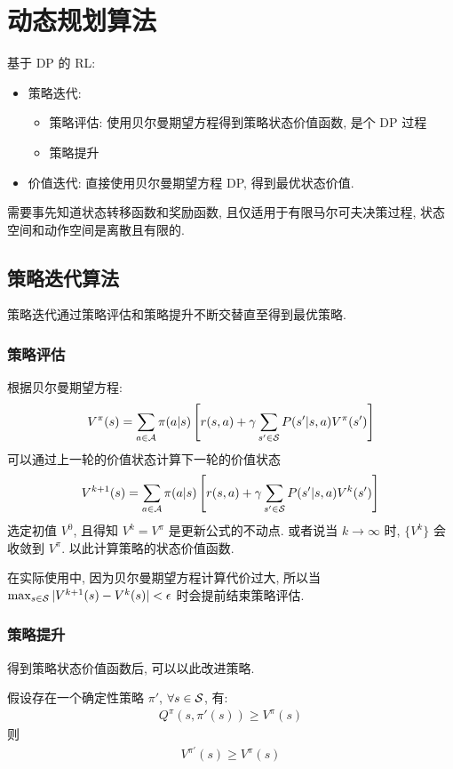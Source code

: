 \newpage
\section{动态规划算法}

基于 DP 的 RL:
\begin{itemize}
    \item 策略迭代:
    \begin{itemize}
        \item 策略评估: 使用贝尔曼期望方程得到策略状态价值函数, 是个 DP 过程
        \item 策略提升
    \end{itemize}
    \item 价值迭代: 直接使用贝尔曼期望方程 DP, 得到最优状态价值. 
\end{itemize}

需要事先知道状态转移函数和奖励函数, 且仅适用于有限马尔可夫决策过程, 状态空间和动作空间是离散且有限的. 


\subsection{策略迭代算法}
策略迭代通过策略评估和策略提升不断交替直至得到最优策略.


\subsubsection{策略评估}
根据贝尔曼期望方程:
\begin{align*}
    V^\pi(s)=\sum_{a\in\mathcal{A}}\pi(a|s) \left[ r(s,a) + \gamma \sum_{s'\in\mathcal{S}} P(s'|s, a)V^\pi(s') \right]
\end{align*}
可以通过上一轮的价值状态计算下一轮的价值状态
\begin{align*}
    V^{k+1}(s)=\sum_{a\in\mathcal{A}}\pi(a|s) \left[ r(s,a) + \gamma \sum_{s'\in\mathcal{S}} P(s'|s, a)V^{k}(s') \right]
\end{align*}
选定初值 $V^0$, 且得知 $V^k=V^\pi$ 是更新公式的不动点. 或者说当 $k\to\infty$ 时, $\{ V^k \}$ 会收敛到 $V^\pi$. 以此计算策略的状态价值函数. 

在实际使用中, 因为贝尔曼期望方程计算代价过大, 所以当 $\max_{s\in\mathcal{S}}| V^{k+1}(s)-V^k(s) |<\epsilon$ 时会提前结束策略评估. 

\subsubsection{策略提升}
得到策略状态价值函数后, 可以以此改进策略. 

\begin{theorem}[策略提升定理]
    假设存在一个确定性策略 $\pi'$, $\forall s\in\mathcal{S}$, 有:
    \begin{align*}
        Q^\pi(s, \pi'(s))\ge V^\pi(s)
    \end{align*}
    则
    \begin{align*}
        V^{\pi'}(s)\ge V^\pi(s)
    \end{align*}
\end{theorem}

